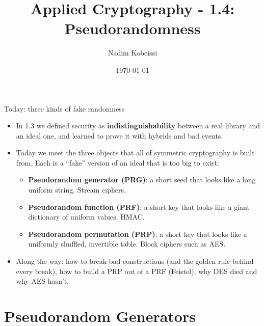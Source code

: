 \ifdefined\PRESENTATION\else\PassOptionsToClass{handout}{beamer}\fi\documentclass[aspectratio=169, lualatex]{beamer}
\title{Applied Cryptography - 1.4: Pseudorandomness}
\author{Nadim Kobeissi}
\institute{Symbolic Software}
\date{\today}
\begin{document}
\begin{frame}[plain]
	\titlepage
\end{frame}

\begin{frame}{Today: three kinds of fake randomness}
	\begin{itemize}
		\item In 1.3 we defined security as \textbf{indistinguishability} between a real library and an ideal one, and learned to prove it with hybrids and bad events.
		\item Today we meet the three objects that all of symmetric cryptography is built from. Each is a ``fake'' version of an ideal that is too big to exist:
		      \begin{itemize}
			      \item \textbf{Pseudorandom generator (PRG)}: a short seed that looks like a long uniform string. Stream ciphers.
			      \item \textbf{Pseudorandom function (PRF)}: a short key that looks like a giant dictionary of uniform values. HMAC.
			      \item \textbf{Pseudorandom permutation (PRP)}: a short key that looks like a uniformly shuffled, invertible table. Block ciphers such as AES.
		      \end{itemize}
		\item Along the way: how to break bad constructions (and the golden rule behind every break), how to build a PRP out of a PRF (Feistel), why DES died and why AES hasn't.
	\end{itemize}
\end{frame}

\section{Pseudorandom Generators}
\end{document}
